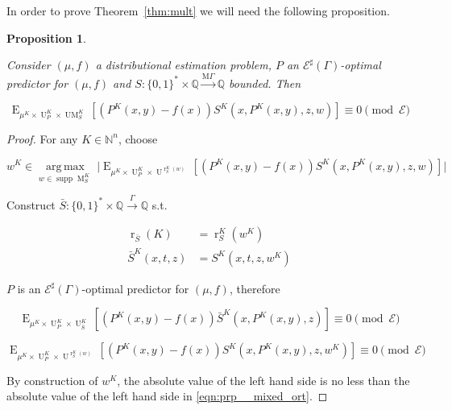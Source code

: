 \documentclass{article}
\numberwithin{equation}{section}
\theoremstyle{definition}
\theoremstyle{plain}
\newtheorem{proposition}{Proposition}[section]
\newcommand{\Bool}{\{0,1\}}
\newcommand{\Words}{{\Bool^*}}
\DeclareMathOperator{\Supp}{supp}
\DeclareMathOperator{\E}{E}
\DeclareMathOperator{\R}{r}
\DeclareMathOperator{\M}{M}
\DeclareMathOperator{\UM}{UM}
\DeclareMathOperator{\Un}{U}
\newcommand{\Argmax}[1]{\underset{#1}{\operatorname{arg\,max}}\,}
\newcommand{\Nats}{\mathbb{N}}
\newcommand{\Rats}{\mathbb{Q}}
\newcommand{\Abs}[1]{\lvert #1 \rvert}
\newcommand{\MGrow}{\mathrm{M}\Gamma}
\newcommand{\Fall}{\mathcal{E}}
\newcommand{\ESG}{\Fall^\sharp(\Gamma)}
\newcommand{\Scheme}{\xrightarrow{\Gamma}}
\newcommand{\MScheme}{\xrightarrow{\MGrow}}
\begin{document}
In order to prove Theorem~\ref{thm:mult} we will need the following proposition.

\begin{samepage}
\begin{proposition}
\label{prp:mixed_ort}

Consider $(\mu,f)$ a distributional estimation problem, $P$ an $\ESG$-optimal predictor for $(\mu,f)$ and $S: \Words \times \Rats \MScheme \Rats$ bounded. Then

\begin{equation}
\label{eqn:prp__mixed_ort}
\E_{\mu^{K} \times \Un_P^{K} \times \UM_S^{K}}[(P^{K}(x,y) - f(x))S^{K}(x,P^{K}(x,y),z,w)] \equiv 0 \pmod \Fall
\end{equation}

\end{proposition}
\end{samepage}

\begin{proof}

For any $K \in \Nats^n$, choose 

$$w^{K} \in \Argmax{w \in \Supp \M_S^{K}} \Abs{\E_{\mu^{K} \times \Un_P^{K} \times \Un^{\R_S^{K}(w)}}[(P^{K}(x,y) - f(x))S^{K}(x,P^{K}(x,y),z,w)]}$$

Construct $\bar{S}: \Words \times \Rats \Scheme \Rats$ s.t. 

\begin{align*}
\R_{\bar{S}}(K)&=\R_S^{K}(w^{K}) \\
\bar{S}^{K}(x,t,z)&=S^{K}(x,t,z,w^{K})
\end{align*}

$P$ is an $\ESG$-optimal predictor for $(\mu,f)$, therefore

$$\E_{\mu^{K} \times \Un_P^{K} \times \Un_{\bar{S}}^{K}}[(P^{K}(x,y) - f(x))\bar{S}^{K}(x,P^{K}(x,y),z)] \equiv 0 \pmod \Fall$$

$$\E_{\mu^{K} \times \Un_P^{K} \times \Un^{\R_S^{K}(w)}}[(P^{K}(x,y) - f(x))S^{K}(x,P^{K}(x,y),z,w^{K})] \equiv 0 \pmod \Fall$$

By construction of $w^{K}$, the absolute value of the left hand side is no less than the absolute value of the left hand side in \ref{eqn:prp__mixed_ort}.
\end{proof}
\end{document}
